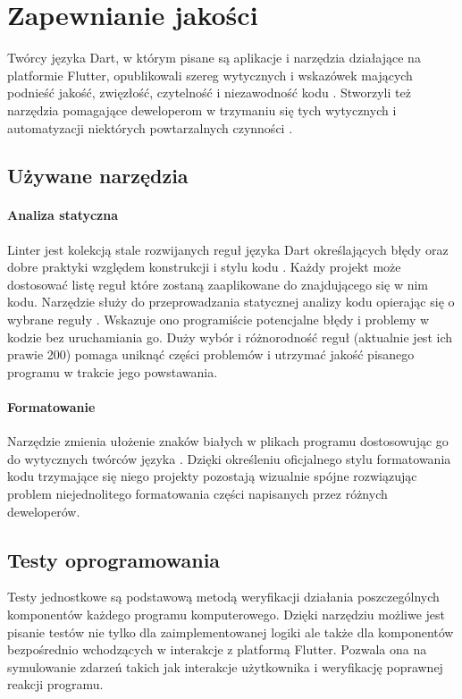 \section{Zapewnianie jakości}
Twórcy języka Dart, w którym pisane są aplikacje i narzędzia działające na platformie Flutter, opublikowali szereg wytycznych i wskazówek mających podnieść jakość, zwięzłość, czytelność i niezawodność kodu \cite{Effective_Dart}. Stworzyli też narzędzia pomagające deweloperom w trzymaniu się tych wytycznych i automatyzacji niektórych powtarzalnych czynności \cite{Dart_SDK}.

\subsection{Używane narzędzia}

\paragraph{Analiza statyczna}
\label{par:static_analysis}
Linter jest kolekcją stale rozwijanych reguł języka Dart określających błędy oraz dobre praktyki względem konstrukcji i stylu kodu \cite{Dart_Lints}. Każdy projekt  może dostosować listę reguł które zostaną zaaplikowane do znajdującego się w nim kodu. Narzędzie  służy do przeprowadzania statycznej analizy kodu opierając się o wybrane reguły \cite{Dart_Analyze}. Wskazuje ono programiście potencjalne błędy i problemy w kodzie bez uruchamiania go. Duży wybór i różnorodność reguł (aktualnie jest ich prawie 200) pomaga uniknąć części problemów i utrzymać jakość pisanego programu w trakcie jego powstawania.

\paragraph{Formatowanie}
\label{{par:dart_format}}
Narzędzie  zmienia ułożenie znaków białych w plikach programu dostosowując go do wytycznych twórców języka \cite{Dart_Format}. Dzięki określeniu oficjalnego stylu formatowania kodu trzymające się niego projekty pozostają wizualnie spójne rozwiązując problem niejednolitego formatowania części napisanych przez różnych deweloperów.

\subsection{Testy oprogramowania}
Testy jednostkowe są podstawową metodą weryfikacji działania poszczególnych komponentów każdego programu komputerowego. Dzięki narzędziu  możliwe jest pisanie testów nie tylko dla zaimplementowanej logiki ale także dla komponentów bezpośrednio wchodzących w interakcje z platformą Flutter. Pozwala ona na symulowanie zdarzeń takich jak interakcje użytkownika i weryfikację poprawnej reakcji programu. 
 
